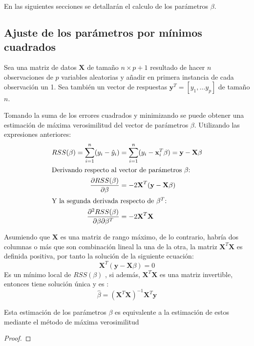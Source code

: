 \noindent En las siguientes secciones se detallarán el calculo de los parámetros $\beta$. 

\newpage
\subsection{Ajuste de los parámetros por mínimos cuadrados}
\noindent Sea una matriz de datos $\textbf{X}$ de tamaño $n\times p+1$ resultado de hacer $n$ observaciones de $p$ variables aleatorias y añadir en primera instancia de cada observación un 1. Sea también un vector de respuestas $\textbf{y}^T=[y_1,\ldots y_p]$ de tamaño $n$. 

\noindent Tomando la suma de los errores cuadrados y minimizando se puede obtener una estimación de máxima verosimilitud del vector de parámetros $\beta$. Utilizando las expresiones anteriores:
\begin{align}
RSS(\beta)=\sum_{i=1}^n(y_i-\hat{y}_i) &= \sum_{i=1}^n(y_i-\textbf{x}_i^T\beta )=\textbf{y}-\textbf{X}\beta\\
\intertext{Derivando respecto al vector de parámetros $\beta$:}
\dfrac{\partial RSS (\beta)}{\partial \beta}&=-2\textbf{X}^T(\textbf{y}-\textbf{X}\beta)\\
\intertext{Y la segunda derivada respecto de $\beta^T$: }
\dfrac{\partial^2 RSS (\beta)}{\partial \beta \partial \beta^T} &=  -2 \textbf{X}^T\textbf{X}
\end{align}

\noindent Asumiendo que $\textbf{X}$ es una matriz de rango máximo, de lo contrario, habría dos columnas o más que son combinación lineal la una de la otra, la matriz $\textbf{X}^T\textbf{X}$ es definida positiva, por tanto la solución de la siguiente ecuación:
\begin{equation}
\textbf{X}^T(\textbf{y}-\textbf{X}\beta)=0
\end{equation}
Es un mínimo local de $RSS(\beta)$ , si además, $\textbf{X}^T\textbf{X}$ es una matriz invertible, entonces tiene solución única y es :
\begin{equation}
\hat{\beta}=(\textbf{X}^T\textbf{X})^{-1}\textbf{X}^T\textbf{y}
\end{equation}

\begin{propo}
Esta estimación de los parámetros $\beta$ es equivalente a la estimación de estos mediante el método de máxima verosimilitud
\begin{proof}

\end{proof}
\end{propo}


